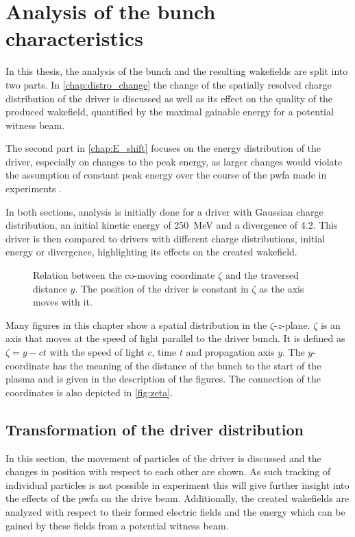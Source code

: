 \documentclass[bachelor_thesis]{subfiles}
\begin{document}
\chapter{Analysis of the bunch characteristics}\label{chap:analysis}
In this thesis, the analysis of the bunch and the resulting wakefields are split into two parts. In \autoref{chap:distro_change} the change of the spatially resolved charge distribution of the driver is discussed 
as well as its effect on the quality of the produced wakefield, quantified by the maximal gainable energy for a potential witness beam.

The second part in \autoref{chap:E_shift} focuses on the energy distribution of the driver, especially on changes to the peak energy, 
as larger changes would violate the assumption of constant peak energy over the course of the \gls{pwfa} made in experiments \cite{Schoebel2022}.

In both sections, analysis is initially done for a driver with Gaussian charge distribution, an initial kinetic energy of \qty{250}{\MeV} and a divergence of \qty{4.2}{\mrad}. 
This driver is then compared to drivers with different charge distributions, initial energy or divergence, highlighting its effects on the created wakefield. 

\begin{figure}
	\centering
	
	\caption{Relation between the co-moving coordinate $\zeta$ and the traversed distance $y$. The position of the driver is constant in $\zeta$ as the axis moves with it.}
	\label{fig:zeta}
\end{figure}
Many figures in this chapter show a spatial distribution in the $\zeta$-$z$-plane. $\zeta$ is  an axis that moves at the speed of light parallel to the driver bunch. It is defined as $\zeta=y-ct$ with the speed of light $c$, time $t$ and propagation axis $y$.
The $y$-coordinate has the meaning of the distance of the bunch to the start of the plasma and is given in the description of the figures. The connection of the coordinates is also depicted in \autoref{fig:zeta}. 

 
\section{Transformation of the driver distribution} \label{chap:distro_change}
In this section, the movement of particles of the driver is discussed and the changes in position with respect to each other are shown. As such tracking of individual particles is not possible in experiment
this will give further insight into the effects of the \gls{pwfa} on the drive beam. Additionally, the created wakefields are analyzed with respect to their formed electric fields and the energy which can be
gained by these fields from a potential witness beam. 
\end{document}
